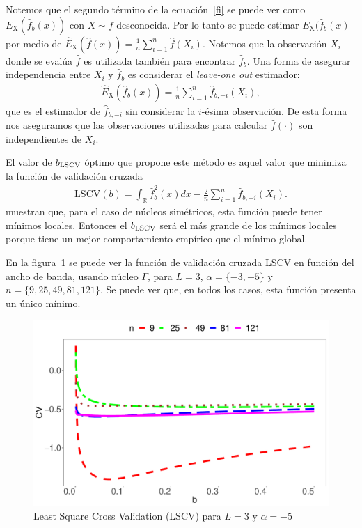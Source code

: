 Notemos que el segundo término de la ecuación~\eqref{fi} se puede ver como $E_\text{X}(\widehat{f}_b(x))$ con $X \sim f$ desconocida. Por lo tanto se puede estimar $E_\text{X}(\widehat{f}_b(x)$ por medio de $\widehat{E}_\text{X}(\widehat{f}(x))=\frac{1}{n}\sum_{i=1}^n \widehat{f}(X_i)$. 
Notemos que la observación $X_i$ donde se evalúa $\widehat{f}$ es utilizada también para encontrar $\widehat{f}_b$. Una forma de asegurar independencia entre $X_i$ y  $\widehat{f}_b$ es considerar el \textit{leave-one out} estimador:
\begin{align}
\widehat{E}_\text{X}(\widehat{f}_b(x))=\frac{1}{n}\sum_{i=1}^n \widehat{f}_{b,-i}(X_i),
\end{align}	
que es el estimador de $\widehat{f}_{b,-i}$ sin considerar la $i$-ésima observación. 
De esta forma nos aseguramos que las observaciones utilizadas para calcular  $\widehat{f}(\cdot)$ son independientes de $X_i.$

El valor de $b_{\tiny \text{LSCV}}$ óptimo que propone este método es aquel valor que minimiza la función de validación cruzada
\begin{align}
\label{LSCV}
\text{LSCV}(b)=\int_\mathbb{R} \widehat{f}_b^2(x)dx - \frac{2}{n}\sum_{i=1}^n \widehat{f}_{b,-i}(X_i).
\end{align}
 \citet{HallMarron1991} muestran que, para el caso de núcleos simétricos, esta función puede tener mínimos locales. Entonces el  $b_{\tiny \text{LSCV}}$ será el más grande de los mínimos locales porque tiene un mejor comportamiento empírico que el mínimo global.

En la figura~\ref{LSCVgraf} se puede ver la función de validación cruzada LSCV en función del ancho de banda, usando núcleo $\Gamma$, para $L=3$, $\alpha=\{-3,-5\}$ y $n=\{9,25,49,81,121\}$. Se puede ver que, en todos los casos, esta función presenta un único mínimo.

\begin{figure}[hbt]
	\centering 
	\includegraphics[scale=0.5]{../../Figures/Tesis/Capitulo5/GraficoLSCValfa=-5.pdf}
	\caption{\label{LSCVgraf} Least Square Cross Validation (LSCV) para $L=3$ y $\alpha=-5$}
\end{figure}

